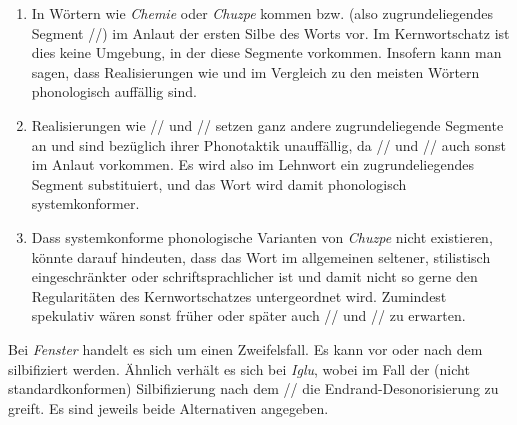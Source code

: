 \begin{enumerate}
  \item In Wörtern wie \textit{Chemie} oder \textit{Chuzpe} kommen \textipa{[\c{c}]} bzw. \textipa{[X]} (also zugrundeliegendes Segment //) im Anlaut der ersten Silbe des Worts vor.
    Im Kernwortschatz ist dies keine Umgebung, in der diese Segmente vorkommen.
    Insofern kann man sagen, dass Realisierungen wie \textipa{[XU\t{ts}p@]} und \textipa{[\c{c}emi:]} im Vergleich zu den meisten Wörtern phonologisch auffällig sind.
  \item Realisierungen wie // und // setzen ganz andere zugrundeliegende Segmente an und sind bezüglich ihrer Phonotaktik unauffällig, da // und // auch sonst im Anlaut vorkommen.
    Es wird also im Lehnwort ein zugrundeliegendes Segment substituiert, und das Wort wird damit phonologisch systemkonformer.
  \item Dass systemkonforme phonologische Varianten von \textit{Chuzpe} nicht existieren, könnte darauf hindeuten, dass das Wort im allgemeinen seltener, stilistisch eingeschränkter oder schriftsprachlicher ist und damit nicht so gerne den Regularitäten des Kernwortschatzes untergeordnet wird.
    Zumindest spekulativ wären sonst früher oder später auch // und // zu erwarten.
\end{enumerate}

\label{sol:phonologie04}

Bei \textit{Fenster} handelt es sich um einen Zweifelsfall.
Es kann vor oder nach dem \textipa{[s]} silbifiziert werden.
Ähnlich verhält es sich bei \textit{Iglu}, wobei im Fall der (nicht standardkonformen) Silbifizierung nach dem // die Endrand-Desonorisierung zu \textipa{[k]} greift. 
Es sind jeweils beide Alternativen angegeben.

